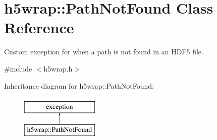 \hypertarget{classh5wrap_1_1_path_not_found}{}\section{h5wrap\+:\+:Path\+Not\+Found Class Reference}
\label{classh5wrap_1_1_path_not_found}


Custom exception for when a path is not found in an H\+D\+F5 file.  




{\ttfamily \#include $<$h5wrap.\+h$>$}

Inheritance diagram for h5wrap\+:\+:Path\+Not\+Found\+:\begin{figure}[H]
\begin{center}
\leavevmode
\includegraphics[height=2.000000cm]{classh5wrap_1_1_path_not_found}
\end{center}
\end{figure}
